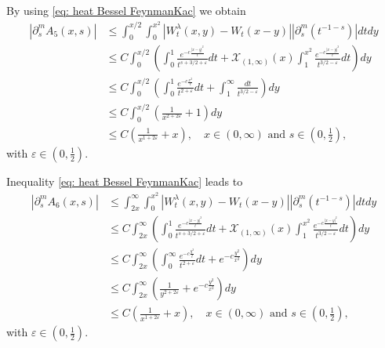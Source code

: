 \documentclass[a4paper,10pt, reqno]{amsart}
\theoremstyle{definition}
\theoremstyle{remark}
\numberwithin{equation}{section}
\begin{document}
 By using \eqref{eq: heat Bessel FeynmanKac} we obtain
\begin{align}\label{eq: proof Thm1.1 fifth term}
    |\partial_s^mA_5(x,s)|& \leq \int_0^{x/2}\int_0^{x^2} |W_t^\lambda (x,y) -W_t(x-y)||\partial_s^m (t^{-1-s})|dtdy\nonumber\\
    &\leq C\int_0^{x/2}\left(\int_0^1\frac{e^{-c\frac{|x-y|^2}{t}}}{t^{s+3/2+\varepsilon }}dt+\mathcal X_{(1,\infty)}(x)\int_1^{x^2}\frac{e^{-c\frac{|x-y|^2}{t}}}{t^{3/2-\varepsilon}}dt\right)dy\nonumber\\
    &\leq C \int_0^{x/2} \left(\int_0^1\frac{e^{-c\frac{x^2}{t}}}{t^{2+\varepsilon }}dt+\int_1^\infty \frac{dt}{t^{3/2-\varepsilon}}\right)dy\nonumber\\
    &\leq C\int_0^{x/2}\left(\frac{1}{x^{2+2\varepsilon}}+1\right)dy\nonumber\\
    &\leq C\left(\frac{1}{x^{1+2\varepsilon}}+x\right),\quad x\in (0,\infty)\mbox{ and }s\in (0,\tfrac12),
\end{align}
with $\varepsilon\in (0,\tfrac12)$.

 Inequality  \eqref{eq: heat Bessel FeynmanKac} leads to
\begin{align}\label{eq: proof Thm1.1 sixth term}
    |\partial_s^mA_6(x,s)|&\leq \int_{2x}^\infty \int_0^{x^2} |W_t^\lambda (x,y) -W_t(x-y)||\partial_s^m(t^{-1-s})|dtdy\nonumber\\
    &\leq C\int_{2x}^\infty \left(\int_0^1\frac{e^{-c\frac{|x-y|^2}{t}}}{t^{s+3/2+\varepsilon }}dt+\mathcal X_{(1,\infty)}(x)\int_1^{x^2}\frac{e^{-c\frac{|x-y|^2}{t}}}{t^{3/2-\varepsilon}}dt\right)dy\nonumber\\
    &\leq C\int_{2x}^\infty \left(\int_0^\infty\frac{e^{-c\frac{y^2}{t}}}{t^{2+\varepsilon }}dt+e^{-c\frac{y^2}{x^2}}\right)dy\nonumber\\
    &\leq C\int_{2x}^\infty \left(\frac{1}{y^{2+2\varepsilon}}+e^{-c\frac{y^2}{x^2}}\right)dy\nonumber\\
    &\leq C\left(\frac{1}{x^{1+2\varepsilon}}+x\right),\quad x\in (0,\infty)\mbox{ and }s\in (0,\tfrac12),
\end{align}
with $\varepsilon \in (0,\tfrac12)$.
\end{document}
